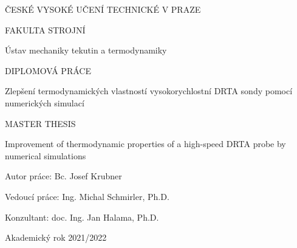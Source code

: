 \abovedisplayskip=0.3cm
\abovedisplayshortskip=-0.3cm
\belowdisplayskip=0.4cm
\belowdisplayshortskip=0.4cm

\thispagestyle{empty}
\begin{center}

    \begin{Large}

        ČESKÉ VYSOKÉ UČENÍ TECHNICKÉ V PRAZE
        
        FAKULTA STROJNÍ
        
        Ústav mechaniky tekutin a termodynamiky
    
        \vspace{4cm}
    
        DIPLOMOVÁ PRÁCE
        
        Zlepšení termodynamických vlastností vysokorychlostní DRTA sondy pomocí numerických simulací
        
        \vspace{1cm}
        
        MASTER THESIS
        
        Improvement of thermodynamic properties of a high-speed DRTA probe by numerical simulations 
        
        \vspace{4cm}
        
        Autor práce: Bc. Josef Krubner
        
        \vspace{1cm}
        
        Vedoucí práce: Ing. Michal Schmirler, Ph.D.
        
        \vspace{1cm}
        
        Konzultant: doc. Ing. Jan Halama, Ph.D.
        
        \vfill %
        
        Akademický rok 2021/2022
        
    \end{Large}
    
\end{center}